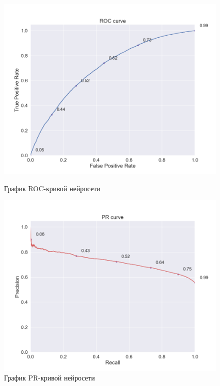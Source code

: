 \begin{figure}[h!]
\centering
\begin{minipage}{.5\textwidth}
\centering
\includegraphics[width=1.0\linewidth]{images/neural_net/roc_curve}
\caption{График ROC-кривой нейросети}
\label{fig:nn_roc}
\end{minipage}%
\begin{minipage}{.5\textwidth}
\centering
\includegraphics[width=1.0\linewidth]{images/neural_net/pr_curve}
\caption{График PR-кривой нейросети}
\label{fig:nn_pr}
\end{minipage}
\end{figure}

